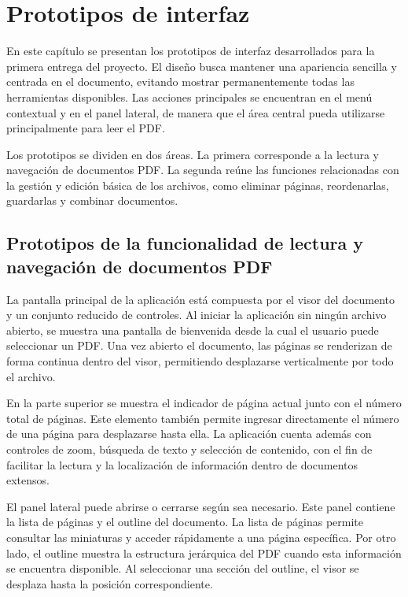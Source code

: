 \chapter{Prototipos de interfaz}

En este capítulo se presentan los prototipos de interfaz desarrollados para la primera entrega del proyecto. El diseño busca mantener una apariencia sencilla y centrada en el documento, evitando mostrar permanentemente todas las herramientas disponibles. Las acciones principales se encuentran en el menú contextual y en el panel lateral, de manera que el área central pueda utilizarse principalmente para leer el PDF.

Los prototipos se dividen en dos áreas. La primera corresponde a la lectura y navegación de documentos PDF. La segunda reúne las funciones relacionadas con la gestión y edición básica de los archivos, como eliminar páginas, reordenarlas, guardarlas y combinar documentos.

\section{Prototipos de la funcionalidad de lectura y navegación de documentos PDF}
La pantalla principal de la aplicación está compuesta por el visor del documento y un conjunto reducido de controles. Al iniciar la aplicación sin ningún archivo abierto, se muestra una pantalla de bienvenida desde la cual el usuario puede seleccionar un PDF. Una vez abierto el documento, las páginas se renderizan de forma continua dentro del visor, permitiendo desplazarse verticalmente por todo el archivo.

En la parte superior se muestra el indicador de página actual junto con el número total de páginas. Este elemento también permite ingresar directamente el número de una página para desplazarse hasta ella. La aplicación cuenta además con controles de zoom, búsqueda de texto y selección de contenido, con el fin
de facilitar la lectura y la localización de información dentro de documentos extensos.

El panel lateral puede abrirse o cerrarse según sea necesario. Este panel contiene la lista de páginas y el outline del documento. La lista de páginas permite consultar las miniaturas y acceder rápidamente a una página específica.
Por otro lado, el outline muestra la estructura jerárquica del PDF cuando esta información se encuentra disponible. Al seleccionar una sección del outline, el visor se desplaza hasta la posición correspondiente.

